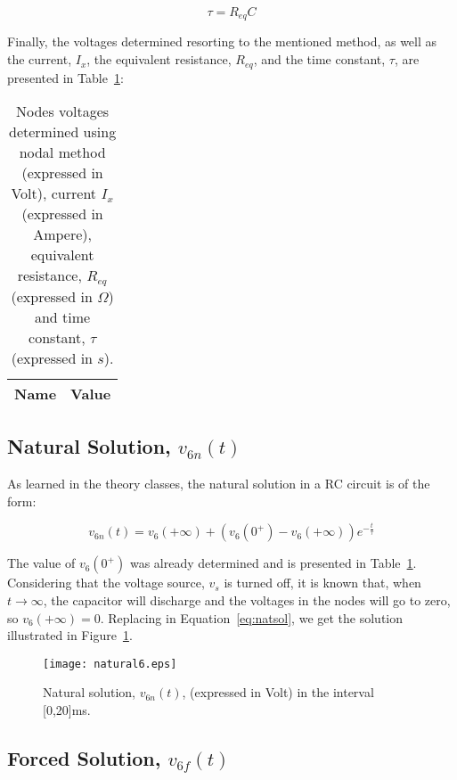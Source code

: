 \begin{equation}
  \tau = R_{eq}C
\end{equation}

Finally, the voltages determined resorting to the mentioned method, as well as the current, $I_x$, the equivalent resistance, $R_{eq}$, and the time constant, $\tau$, are presented in Table~\ref{tab:node2}:

\begin{table}[H]
  \centering
  \begin{tabular}{|l|r|}
    \hline    
    {\bf Name} & {\bf Value} \\ \hline
    
  \end{tabular}
  \caption{Nodes voltages determined using nodal method (expressed in Volt), current $I_x$ (expressed in Ampere), equivalent resistance, $R_{eq}$ (expressed in $\Omega$) and time constant, $\tau$ (expressed in $s$).}
  \label{tab:node2}
\end{table}


\subsection{Natural Solution, $v_{6n}(t)$}\label{subsec:natsol}

As learned in the theory classes, the natural solution in a RC circuit is of the form:

\begin{equation}
  v_{6n}(t) = v_6(+\infty)+(v_6(0^+)-v_6(+\infty))e^{-\frac{t}{\tau}}
  \label{eq:natsol}
\end{equation}

The value of $v_6(0^+)$ was already determined and is presented in Table~\ref{tab:node2}. Considering that the voltage source, $v_s$ is turned off, it is known that, when $t \rightarrow \infty$, the capacitor will discharge and the voltages in the nodes will go to zero, so $v_6(+\infty)=0$. Replacing in Equation~\ref{eq:natsol}, we get the solution illustrated in Figure~\ref{fig:natsol}.

\begin{figure}[H] \centering
\texttt{[image: natural6.eps]}
\caption{Natural solution, $v_{6n}(t)$, (expressed in Volt) in the interval [0,20]ms.}
\label{fig:natsol}
\end{figure}


\subsection{Forced Solution, $v_{6f}(t)$} \label{subsec:forsol}

